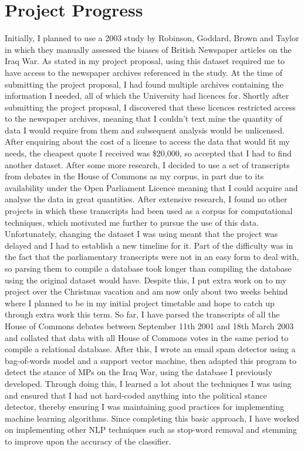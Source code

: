 \documentclass[]{article}
\begin{document}
\section*{Project Progress}
Initially, I planned to use a 2003 study by Robinson, Goddard, Brown and Taylor in which they manually assessed the biases of British Newspaper articles on the Iraq War. As stated in my project proposal, using this dataset required me to have access to the newspaper archives referenced in the study. At the time of submitting the project proposal, I had found multiple archives containing the information I needed, all of which the University had licences for. Shortly after submitting the project proposal, I discovered that these licences restricted access to the newspaper archives, meaning that I couldn’t text mine the quantity of data I would require from them and subsequent analysis would be unlicensed. After enquiring about the cost of a license to access the data that would fit my needs, the cheapest quote I received was \$20,000, so accepted that I had to find another dataset.
\newline
\newline
After some more research, I decided to use a set of transcripts from debates in the House of Commons as my corpus, in part due to its availability under the Open Parliament Licence meaning that I could acquire and analyse the data in great quantities. After extensive research, I found no other projects in which these transcripts had been used as a corpus for computational techniques, which motivated me further to pursue the use of this data.
\newline
\newline
Unfortunately, changing the dataset I was using meant that the project was delayed and I had to establish a new timeline for it. Part of the difficulty was in the fact that the parliamentary transcripts were not in an easy form to deal with, so parsing them to compile a database took longer than compiling the database using the original dataset would have. Despite this, I put extra work on to my project over the Christmas vacation and am now only about two weeks behind where I planned to be in my initial project timetable and hope to catch up through extra work this term.
\newline
\newline
So far, I have parsed the transcripts of all the House of Commons debates between September 11th 2001 and 18th March 2003 and collated that data with all House of Commons votes in the same period to compile a relational database. After this, I wrote an email spam detector using a bag-of-words model and a support vector machine, then adapted this program to detect the stance of MPs on the Iraq War, using the database I previously developed. Through doing this, I learned a lot about the techniques I was using and ensured that I had not hard-coded anything into the political stance detector, thereby ensuring I was maintaining good practices for implementing machine learning algorithms. Since completing this basic approach, I have worked on implementing other NLP techniques such as stop-word removal and stemming to improve upon the accuracy of the classifier. 
\end{document}
